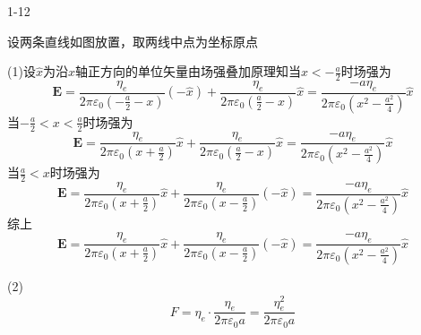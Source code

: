 \documentclass{phyasgn}
\begin{document}
{\heiti\color{red} 1-12}
\begin{sol}
    设两条直线如图放置，取两线中点为坐标原点
    \begin{figure}[htbp]
    \end{figure}
    
(1)设$\hat{x}$为沿$x$轴正方向的单位矢量由场强叠加原理知当$x<-\frac{a}{2}$时场强为
$$
\mathbf{E}=\frac{\eta_e}{2\pi\varepsilon_0(-\frac{a}{2}-x)}(-\hat{x})+\frac{\eta_e}{2\pi\varepsilon_0(\frac{a}{2}-x)}\hat{x}=\frac{-a\eta_e}{2\pi\varepsilon_0(x^2-\frac{a^2}{4})}\hat{x}
$$
当$-\frac{a}{2}<x<\frac{a}{2}$时场强为
$$
\mathbf{E}=\frac{\eta_e}{2\pi\varepsilon_0(x+\frac{a}{2})}\hat{x}+\frac{\eta_e}{2\pi\varepsilon_0(\frac{a}{2}-x)}\hat{x}=\frac{-a\eta_e}{2\pi\varepsilon_0(x^2-\frac{a^2}{4})}\hat{x}
$$
当$\frac{a}{2}<x$时场强为
$$
\mathbf{E}=\frac{\eta_e}{2\pi\varepsilon_0(x+\frac{a}{2})}\hat{x}+\frac{\eta_e}{2\pi\varepsilon_0(x-\frac{a}{2})}(-\hat{x})=\frac{-a\eta_e}{2\pi\varepsilon_0(x^2-\frac{a^2}{4})}\hat{x}
$$
综上$$
\mathbf{E}=\frac{\eta_e}{2\pi\varepsilon_0(x+\frac{a}{2})}\hat{x}+\frac{\eta_e}{2\pi\varepsilon_0(x-\frac{a}{2})}(-\hat{x})=\frac{-a\eta_e}{2\pi\varepsilon_0(x^2-\frac{a^2}{4})}\hat{x}
$$
\par
(2)$$
F=\eta_e\cdot\frac{\eta_e}{2\pi\varepsilon_0a}=\frac{\eta_e^2}{2\pi\varepsilon_0a}
$$
\end{sol}\par
\end{document}
